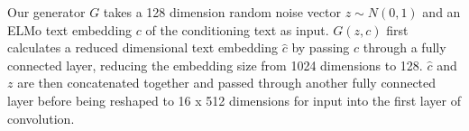 Our generator $G$ takes a 128 dimension random noise vector $z \sim N(0, 1)$ and an ELMo text embedding $c$ of the conditioning text as input. $G(z, c)$ first calculates a reduced dimensional text embedding $\hat{c}$ by passing $c$ through a fully connected layer, reducing the embedding size from 1024 dimensions to 128. $\hat{c}$ and $z$ are then concatenated together and passed through another fully connected layer before being reshaped to 16 x 512 dimensions for input into the first layer of convolution.